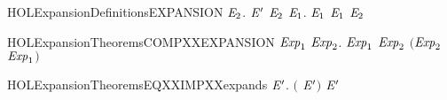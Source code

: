 \begin{SaveVerbatim}{HOLExpansionDefinitionsEXPANSION}
           \HOLSymConst{\HOLTokenForall{}}\ensuremath{\HOLBoundVar{E}\sb{\mathrm{2}}}. \ensuremath{\HOLBoundVar{E}\sp{\prime}} \HOLTokenTransBegin\HOLConst{\ensuremath{\tau}}\HOLTokenTransEnd \ensuremath{\HOLBoundVar{E}\sb{\mathrm{2}}} \HOLSymConst{\HOLTokenImp{}} \HOLSymConst{\HOLTokenExists{}}\ensuremath{\HOLBoundVar{E}\sb{\mathrm{1}}}.  \HOLTokenWeakTransBegin\HOLConst{\ensuremath{\tau}}\HOLTokenWeakTransEnd \ensuremath{\HOLBoundVar{E}\sb{\mathrm{1}}} \HOLSymConst{\HOLTokenConj{}}  \ensuremath{\HOLBoundVar{E}\sb{\mathrm{1}}} \ensuremath{\HOLBoundVar{E}\sb{\mathrm{2}}}
\end{SaveVerbatim}
\newcommand{\HOLExpansionDefinitionsEXPANSION}{\UseVerbatim{HOLExpansionDefinitionsEXPANSION}}
\newcommand{\HOLExpansionDefinitions}{
\HOLDfnTag{Expansion}{expands_def}\HOLExpansionDefinitionsexpandsXXdef
\HOLDfnTag{Expansion}{EXPANSION}\HOLExpansionDefinitionsEXPANSION
}
\begin{SaveVerbatim}{HOLExpansionTheoremsCOMPXXEXPANSION}
\HOLTokenTurnstile{} \HOLSymConst{\HOLTokenForall{}}\ensuremath{\HOLBoundVar{Exp}\sb{\mathrm{1}}} \ensuremath{\HOLBoundVar{Exp}\sb{\mathrm{2}}}.
        \ensuremath{\HOLBoundVar{Exp}\sb{\mathrm{1}}} \HOLSymConst{\HOLTokenConj{}}  \ensuremath{\HOLBoundVar{Exp}\sb{\mathrm{2}}} \HOLSymConst{\HOLTokenImp{}}  \ensuremath{(}\ensuremath{\HOLBoundVar{Exp}\sb{\mathrm{2}}}  \ensuremath{\HOLBoundVar{Exp}\sb{\mathrm{1}}}\ensuremath{)}
\end{SaveVerbatim}
\newcommand{\HOLExpansionTheoremsCOMPXXEXPANSION}{\UseVerbatim{HOLExpansionTheoremsCOMPXXEXPANSION}}
\begin{SaveVerbatim}{HOLExpansionTheoremsEQXXIMPXXexpands}
\HOLTokenTurnstile{} \HOLSymConst{\HOLTokenForall{}} \ensuremath{\HOLBoundVar{E}\sp{\prime}}. \ensuremath{(} \HOLSymConst{\ensuremath{=}} \ensuremath{\HOLBoundVar{E}\sp{\prime}}\ensuremath{)} \HOLSymConst{\HOLTokenImp{}}   \ensuremath{\HOLBoundVar{E}\sp{\prime}}
\end{SaveVerbatim}
\newcommand{\HOLExpansionTheoremsEQXXIMPXXexpands}{\UseVerbatim{HOLExpansionTheoremsEQXXIMPXXexpands}}
